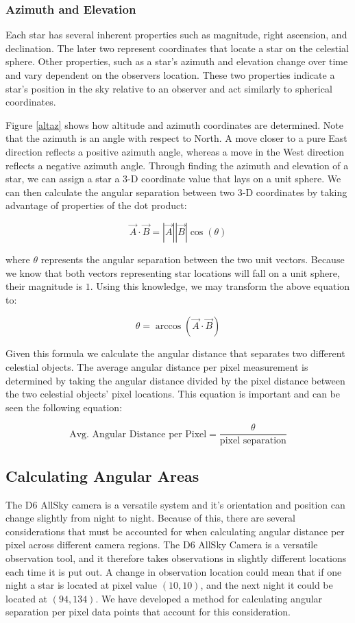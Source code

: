 \subsubsection{Azimuth and Elevation}

Each star has several inherent properties such as magnitude, right ascension, and declination.  
The later two represent coordinates that locate a star on the celestial sphere.  
Other properties, such as a star's azimuth and elevation change over time and vary dependent on the observers location.  
These two properties indicate a star's position in the sky relative to an observer and act similarly to spherical coordinates.

Figure \ref{altaz} shows how altitude and azimuth coordinates are determined. 
Note that the azimuth is an angle with respect to North.
A move closer to a pure East direction reflects a positive azimuth angle, whereas a move in the West direction reflects a negative azimuth angle.
Through finding the azimuth and elevation of a star, we can assign a star a 3-D coordinate value that lays on a unit sphere.  
We can then calculate the angular separation between two 3-D coordinates by taking advantage of properties of the dot product:

$$ \vec{A} \cdot \vec{B} = |\vec{A}||\vec{B}| \cos{(\theta)} $$

where $\theta$ represents the angular separation between the two unit vectors.  
Because we know that both vectors representing star locations will fall on a unit sphere, their magnitude is $1$.
Using this knowledge, we may transform the above equation to:

$$ \theta = \arccos{(\vec{A} \cdot \vec{B})} $$

Given this formula we calculate the angular distance that separates two different celestial objects.
The average angular distance per pixel measurement is determined by taking the angular distance divided by the pixel distance between the two celestial objects' pixel locations.
This equation is important and can be seen the following equation:

$$ \textrm{Avg. Angular Distance per Pixel} = \frac{\theta}{\textrm{pixel separation}} $$




\subsection{Calculating Angular Areas}

The D6 AllSky camera is a versatile system and it's orientation and position can change slightly from night to night.
Because of this, there are several considerations that must be accounted for when calculating angular distance per pixel across different camera regions.
The D6 AllSky Camera is a versatile observation tool, and it therefore takes observations in slightly different locations each time it is put out.
A change in observation location could mean that if one night a star is located at pixel value $(10,10)$, and the next night it could be located at $(94,134)$.
We have developed a method for calculating angular separation per pixel data points that account for this consideration.

